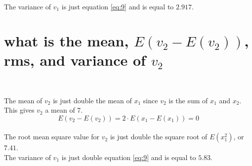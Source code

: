 \documentclass[12pt,letterpaper, onecolumn]{exam}
\begin{document}
\begin{questions}
\begin{parts}
                    The variance of $v_1$ is just equation \ref{eq:9} and is equal to $2.917$.\\
            \part{what is the mean, $E(v_2 - E(v_2))$, rms, and variance of $v_2$}\\
                \solution
                    
                    The mean of $v_2$ is just double the mean of $x_1$ since $v_2$ is the sum of $x_1$ and $x_2$. This gives $v_2$ a mean of 7.\\
                    
                    \begin{equation}
                        E(v_2 - E(v_2)) = 2\cdot E(x_1 - E(x_1)) = 0
                    \end{equation}\\
                    
                    The root mean square value for $v_2$ is just double the square root of $E(x_1^2)$, or $7.41$.\\
                    
                    The variance of $v_1$ is just double equation \ref{eq:9} and is equal to $5.83$.\\

\end{parts}
\end{questions}
\end{document}
